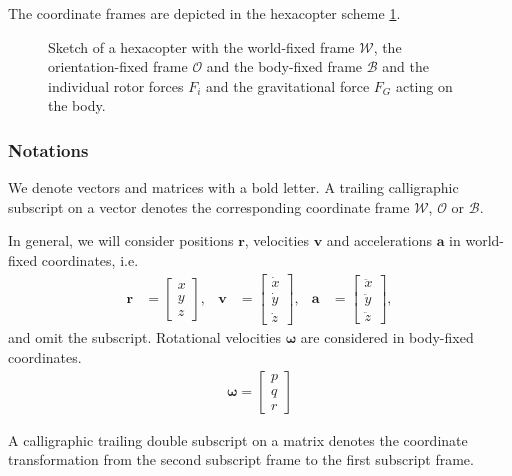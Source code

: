 The coordinate frames are depicted in the hexacopter scheme \ref{fig:hexa}.


\begin{figure}
   \centering
   \def\svgwidth{0.75\textwidth}
   
   \caption{Sketch of a hexacopter with the world-fixed frame $\mathcal{W}$, the orientation-fixed frame $\mathcal{O}$ and the body-fixed frame $\mathcal{B}$ and the individual rotor forces $F_{i}$ and the gravitational force $F_G$ acting on the body.}
   \label{fig:hexa}
\end{figure}


\subsubsection{Notations}
We denote vectors and matrices with a bold letter. A trailing calligraphic subscript on a vector denotes the corresponding coordinate frame $\mathcal{W}$, $\mathcal{O}$ or $\mathcal{B}$. 

In general, we will consider positions $\mathbf{r}$, velocities $\mathbf{v}$ and accelerations $\mathbf{a}$ in world-fixed coordinates, i.e.
\begin{align}
\mathbf{r} &= \begin{bmatrix}
x \\ y \\ z
\end{bmatrix},
& \mathbf{v} &= \begin{bmatrix}
\dot{x} \\ \dot{y} \\ \dot{z}
\end{bmatrix},
& \mathbf{a} &= \begin{bmatrix}
\ddot{x} \\ \ddot{y} \\ \ddot{z}
\end{bmatrix},
\end{align}
and omit the subscript. Rotational velocities $\boldsymbol{\omega}$ are considered in body-fixed coordinates.
\begin{align}
\boldsymbol{\omega} = \begin{bmatrix}
p \\ q \\ r
\end{bmatrix}
\end{align}

A calligraphic trailing double subscript on a matrix denotes the coordinate transformation from the second subscript frame to the first subscript frame. 

